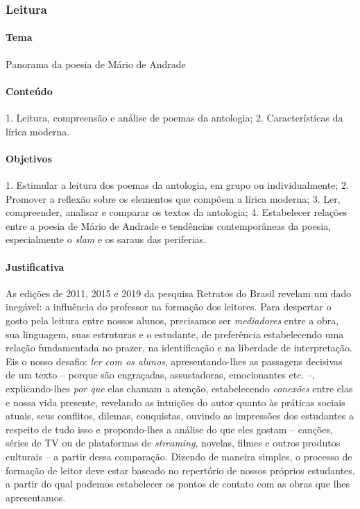 \documentclass[11pt]{extarticle}
\begin{document}
\subsubsection{Leitura}





\paragraph{Tema} Panorama da poesia de Mário de Andrade

\paragraph{Conteúdo} 1. Leitura, compreensão e análise de poemas da
antologia; 2. Características da lírica moderna.

\paragraph{Objetivos} 1. Estimular a leitura dos poemas da antologia, em
grupo ou individualmente; 2. Promover a reflexão sobre os elementos que
compõem a lírica moderna; 3. Ler, compreender, analisar e comparar os
textos da antologia; 4. Estabelecer relações entre a poesia de Mário de
Andrade e tendências contemporâneas da poesia, especialmente o
\emph{slam} e os saraus das periferias.

\paragraph{Justificativa} As edições de 2011, 2015 e 2019 da pesquisa
Retratos do Brasil revelam um dado inegável: a influência do professor
na formação dos leitores. Para despertar o gosto pela leitura entre
nossos alunos, precisamos ser \emph{mediadores} entre a obra, sua
linguagem, suas estruturas e o estudante, de preferência estabelecendo
uma relação fundamentada no prazer, na identificação e na liberdade de
interpretação. Eis o nosso desafio: \emph{ler com os alunos},
apresentando-lhes as passagens decisivas de um texto -- porque são
engraçadas, assustadoras, emocionantes etc. --, explicando-lhes
\emph{por que} elas chamam a atenção, estabelecendo \emph{conexões}
entre elas e nossa vida presente, revelando as intuições do autor quanto
às práticas sociais atuais, seus conflitos, dilemas, conquistas, ouvindo
as impressões dos estudantes a respeito de tudo isso e propondo-lhes a
análise do que eles gostam -- canções, séries de TV ou de plataformas de
\emph{streaming}, novelas, filmes e outros produtos culturais -- a
partir dessa comparação. Dizendo de maneira simples, o processo de
formação de leitor deve estar baseado no repertório de nossos próprios
estudantes, a partir do qual podemos estabelecer os pontos de contato
com as obras que lhes apresentamos.
\end{document}
